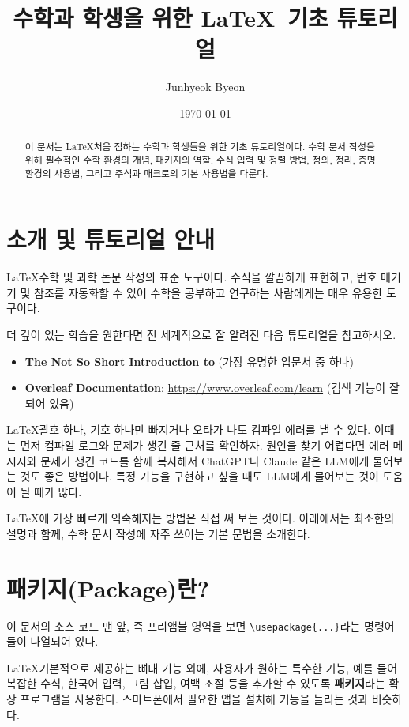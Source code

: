 \documentclass[11pt, a4paper]{article}
\title{\textbf{수학과 학생을 위한 \LaTeX\ 기초 튜토리얼}}
\author{Junhyeok Byeon}
\date{\today}
\theoremstyle{plain}
\theoremstyle{definition}
\theoremstyle{remark}
\begin{document}
\maketitle

\begin{abstract}
이 문서는 \LaTeX\을 처음 접하는 수학과 학생들을 위한 기초 튜토리얼이다. 수학 문서 작성을 위해 필수적인 수학 환경의 개념, 패키지의 역할, 수식 입력 및 정렬 방법, 정의, 정리, 증명 환경의 사용법, 그리고 주석과 매크로의 기본 사용법을 다룬다.
\end{abstract}

\section{소개 및 튜토리얼 안내}

\LaTeX\은 수학 및 과학 논문 작성의 표준 도구이다. 수식을 깔끔하게 표현하고, 번호 매기기 및 참조를 자동화할 수 있어 수학을 공부하고 연구하는 사람에게는 매우 유용한 도구이다.

더 깊이 있는 학습을 원한다면 전 세계적으로 잘 알려진 다음 튜토리얼을 참고하시오.
\begin{itemize}
    \item \textbf{The Not So Short Introduction to \LaTeXe} (가장 유명한 입문서 중 하나)
    \item \textbf{Overleaf Documentation}: \url{https://www.overleaf.com/learn}
    \quad (검색 기능이 잘 되어 있음)
\end{itemize}

\LaTeX\은 괄호 하나, 기호 하나만 빠지거나 오타가 나도 컴파일 에러를 낼 수 있다. 이때는 먼저 컴파일 로그와 문제가 생긴 줄 근처를 확인하자. 원인을 찾기 어렵다면 에러 메시지와 문제가 생긴 코드를 함께 복사해서 ChatGPT나 Claude 같은 LLM에게 물어보는 것도 좋은 방법이다. 특정 기능을 구현하고 싶을 때도 LLM에게 물어보는 것이 도움이 될 때가 많다. \newline

{\LaTeX}에 가장 빠르게 익숙해지는 방법은 직접 써 보는 것이다. 아래에서는 최소한의 설명과 함께, 수학 문서 작성에 자주 쓰이는 기본 문법을 소개한다.

\section{패키지(Package)란?}

이 문서의 소스 코드 맨 앞, 즉 프리앰블 영역을 보면 \verb|\usepackage{...}|라는 명령어들이 나열되어 있다.

\LaTeX\은 기본적으로 제공하는 뼈대 기능 외에, 사용자가 원하는 특수한 기능, 예를 들어 복잡한 수식, 한국어 입력, 그림 삽입, 여백 조절 등을 추가할 수 있도록 \textbf{패키지}라는 확장 프로그램을 사용한다. 스마트폰에서 필요한 앱을 설치해 기능을 늘리는 것과 비슷하다.
\end{document}
